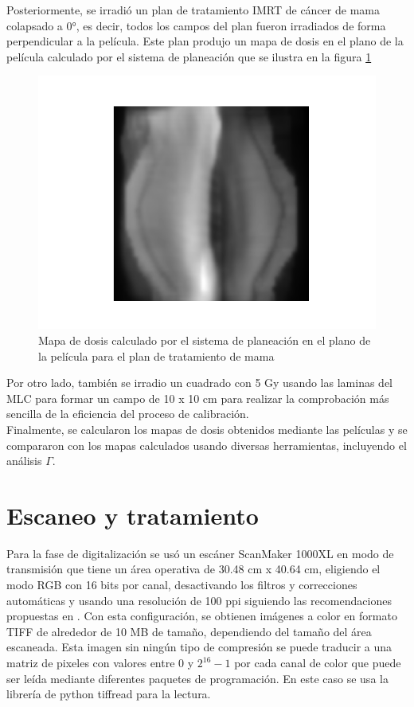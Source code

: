 Posteriormente, se irradió un plan de tratamiento IMRT de cáncer de mama colapsado a 0°, es decir, todos los campos del plan fueron irradiados de forma perpendicular a la película. Este plan produjo un mapa de dosis en el plano de la película calculado por el sistema de planeación que se ilustra en la figura \ref{fig:TPSMama}\\

\begin{figure}
	\centering
	\includegraphics[width=0.7\linewidth]{images/mamaTPS.png}
	\caption{Mapa de dosis calculado por el sistema de planeación en el plano de la película para el plan de tratamiento de mama}
	\label{fig:TPSMama}
\end{figure}

Por otro lado, también se irradio un cuadrado con 5 Gy usando las laminas del MLC para formar un campo de 10 x 10 cm para realizar la comprobación más sencilla de la eficiencia del proceso de calibración.\\

Finalmente, se calcularon los mapas de dosis obtenidos mediante las películas y se compararon con los mapas calculados usando diversas herramientas, incluyendo el análisis $\Gamma$.

\section{Escaneo y tratamiento}
Para la fase de digitalización se usó un escáner ScanMaker 1000XL en modo de transmisión que tiene un área operativa de 30.48 cm x 40.64 cm, eligiendo el modo RGB con 16 bits por canal, desactivando los filtros y correcciones automáticas y usando una resolución de 100 ppi siguiendo las recomendaciones propuestas en \cite{Devic2016}. Con esta configuración, se obtienen imágenes a color en formato TIFF de alrededor de 10 MB de tamaño, dependiendo del tamaño del área escaneada. Esta imagen sin ningún tipo de compresión se puede traducir a una matriz de pixeles con valores entre $0$ y $2^{16}-1$ por cada canal de color que puede ser leída mediante diferentes paquetes de programación. En este caso se usa la librería de python tiffread para la lectura. \\



